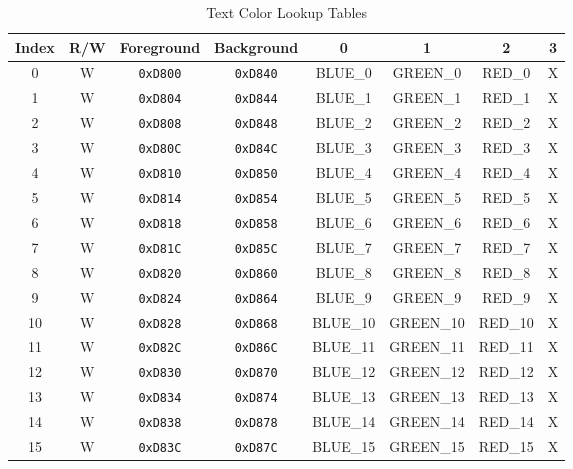 \begin{table}[ht]
    \begin{center}
        \begin{tabular}{|c|c|c|c|c|c|c|c|} \hline
            Index & R/W & Foreground & Background & 0 & 1 & 2 & 3 \\ \hline\hline
            0 & W & \verb+0xD800+ & \verb+0xD840+ & BLUE\_0 & GREEN\_0 & RED\_0 & X \\ \hline
            1 & W & \verb+0xD804+ & \verb+0xD844+ & BLUE\_1 & GREEN\_1 & RED\_1 & X \\ \hline
            2 & W & \verb+0xD808+ & \verb+0xD848+ & BLUE\_2 & GREEN\_2 & RED\_2 & X \\ \hline
            3 & W & \verb+0xD80C+ & \verb+0xD84C+ & BLUE\_3 & GREEN\_3 & RED\_3 & X \\ \hline
            4 & W & \verb+0xD810+ & \verb+0xD850+ & BLUE\_4 & GREEN\_4 & RED\_4 & X \\ \hline
            5 & W & \verb+0xD814+ & \verb+0xD854+ & BLUE\_5 & GREEN\_5 & RED\_5 & X \\ \hline
            6 & W & \verb+0xD818+ & \verb+0xD858+ & BLUE\_6 & GREEN\_6 & RED\_6 & X \\ \hline
            7 & W & \verb+0xD81C+ & \verb+0xD85C+ & BLUE\_7 & GREEN\_7 & RED\_7 & X \\ \hline
            8 & W & \verb+0xD820+ & \verb+0xD860+ & BLUE\_8 & GREEN\_8 & RED\_8 & X \\ \hline
            9 & W & \verb+0xD824+ & \verb+0xD864+ & BLUE\_9 & GREEN\_9 & RED\_9 & X \\ \hline
            10 & W & \verb+0xD828+ & \verb+0xD868+ & BLUE\_10 & GREEN\_10 & RED\_10 & X \\ \hline
            11 & W & \verb+0xD82C+ & \verb+0xD86C+ & BLUE\_11 & GREEN\_11 & RED\_11 & X \\ \hline
            12 & W & \verb+0xD830+ & \verb+0xD870+ & BLUE\_12 & GREEN\_12 & RED\_12 & X \\ \hline
            13 & W & \verb+0xD834+ & \verb+0xD874+ & BLUE\_13 & GREEN\_13 & RED\_13 & X \\ \hline
            14 & W & \verb+0xD838+ & \verb+0xD878+ & BLUE\_14 & GREEN\_14 & RED\_14 & X \\ \hline
            15 & W & \verb+0xD83C+ & \verb+0xD87C+ & BLUE\_15 & GREEN\_15 & RED\_15 & X \\ \hline
        \end{tabular}
    \end{center}
    \caption{Text Color Lookup Tables}
    \label{tab:text_luts}
\end{table}

